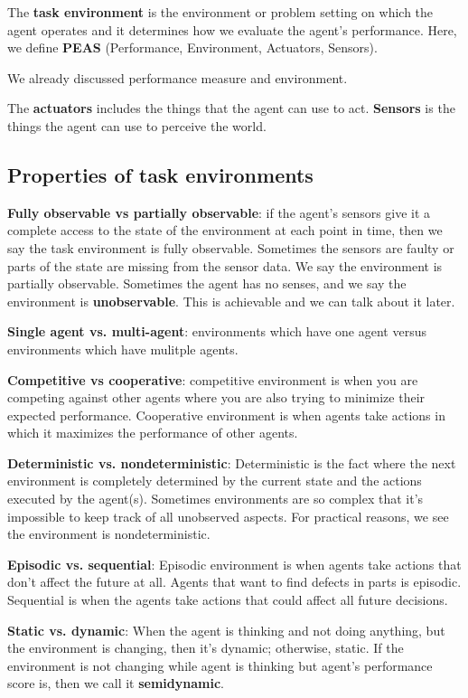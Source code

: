\documentclass[12pt,a4paper]{article}
\begin{document}
The \textbf{task environment} is the environment or problem setting on which the agent operates and it determines how we evaluate the agent's performance. Here, we define \textbf{PEAS} (Performance, Environment, Actuators, Sensors).

We already discussed performance measure and environment.

The \textbf{actuators} includes the things that the agent can use to act. \textbf{Sensors} is the things the agent can use to perceive the world.

\subsection{Properties of task environments}

\textbf{Fully observable vs partially observable}: if the agent's sensors give it a complete access to the state of the environment at each point in time, then we say the task environment is fully observable. Sometimes the sensors are faulty or parts of the state are missing from the sensor data. We say the environment is partially observable. Sometimes the agent has no senses, and we say the environment is \textbf{unobservable}. This is achievable and we can talk about it later.

\textbf{Single agent vs. multi-agent}: environments which have one agent versus environments which have mulitple agents.

\textbf{Competitive vs cooperative}: competitive environment is when you are competing against other agents where you are also trying to minimize their expected performance. Cooperative environment is when agents take actions in which it maximizes the performance of other agents.

\textbf{Deterministic vs. nondeterministic}: Deterministic is the fact where the next environment is completely determined by the current state and the actions executed by the agent(s). Sometimes environments are so complex that it's impossible to keep track of all unobserved aspects. For practical reasons, we see the environment is nondeterministic.

\textbf{Episodic vs. sequential}: Episodic environment is when agents take actions that don't affect the future at all. Agents that want to find defects in parts is episodic. Sequential is when the agents take actions that could affect all future decisions.

\textbf{Static vs. dynamic}: When the agent is thinking and not doing anything, but the environment is changing, then it's dynamic; otherwise, static. If the environment is not changing while agent is thinking but agent's performance score is, then we call it \textbf{semidynamic}.
\end{document}
